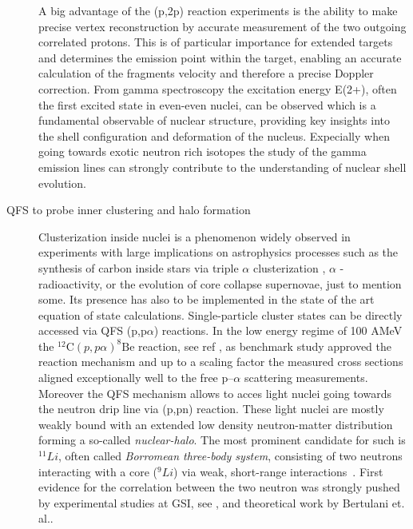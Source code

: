 \begin{description}
A big advantage of the (p,2p) reaction experiments is the ability to make precise vertex reconstruction by accurate measurement of the two outgoing correlated protons. This is of particular importance for extended targets and determines the emission point within the target, enabling an accurate calculation of the fragment\textquotesingle s velocity and therefore a precise Doppler correction.\newline
From gamma spectroscopy the excitation energy E(2+), often the first excited state in even-even nuclei, can be observed which is a fundamental observable of nuclear structure, providing key insights into the shell configuration and deformation of the nucleus\cite{panin2021quasi}. Expecially when going towards exotic neutron rich isotopes the study of the gamma emission lines can strongly contribute to the understanding of nuclear shell evolution.
\item[QFS to probe inner clustering and halo formation]Clusterization inside nuclei is a phenomenon widely observed in experiments with large implications on astrophysics processes such as the synthesis of carbon  inside stars via triple $\alpha$ clusterization \cite{hjorth2011carbon}, $\alpha$ - radioactivity, or the evolution of core collapse supernovae\cite{sumiyoshi2008appearance}, just to mention some. Its presence has also to be implemented in the state of the art equation of state calculations.\newline
Single-particle cluster states can be directly accessed via QFS (p,p$\alpha$) reactions. In the low energy regime of 100 AMeV the $^{12}\text{C}(p, p\alpha)^{8}\text{Be}$ reaction, see ref \cite{mabiala2009analyzing}, as benchmark study approved the reaction mechanism and up to a scaling factor the measured cross sections aligned exceptionally well to the free p–$\alpha$ scattering measurements.\newline
Moreover the QFS mechanism allows to acces light nuclei going towards the neutron drip line via (p,pn) reaction. These light nuclei are mostly weakly bound with an extended low density neutron-matter distribution forming a so-called \textit{nuclear-halo}.\newline
The most prominent candidate for such is $^{11}Li$, often called \textit{Borromean three-body system}, consisting of two neutrons interacting with a core ($^9Li$) via weak, short-range interactions~\cite{johannsen199011li}. First evidence for the correlation  between the two neutron was strongly pushed by experimental studies at GSI, see \cite{simon1999direct}, and theoretical work by Bertulani et. al.\cite{bertulani2007geometry}.\newline

\end{description}
